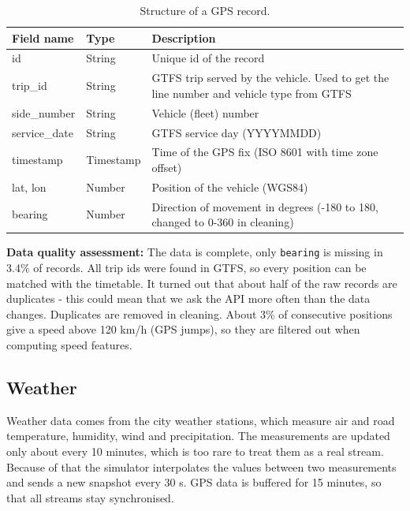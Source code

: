 \documentclass[11pt]{article}
\begin{document}
\begin{table}[H]
\centering
\caption{Structure of a GPS record.}\label{tab:fields-gps}
\begin{tabular}{|>{\raggedright\arraybackslash}p{3.6cm}|>{\raggedright\arraybackslash}p{2cm}|>{\raggedright\arraybackslash}p{8cm}|}
\hline
\textbf{Field name} & \textbf{Type} & \textbf{Description} \\
\hline
id & String & Unique id of the record \\ \hline
trip\_id & String & GTFS trip served by the vehicle. Used to get the line number and vehicle type from GTFS \\ \hline
side\_number & String & Vehicle (fleet) number \\ \hline
service\_date & String & GTFS service day (YYYYMMDD) \\ \hline
timestamp & Timestamp & Time of the GPS fix (ISO 8601 with time zone offset) \\ \hline
lat, lon & Number & Position of the vehicle (WGS84) \\ \hline
bearing & Number & Direction of movement in degrees (-180 to 180, changed to 0-360 in cleaning) \\ \hline
\end{tabular}
\end{table}

\noindent\textbf{Data quality assessment:}
The data is complete, only \texttt{bearing} is missing in 3.4\% of records. All trip ids were found in GTFS, so every position can be matched with the timetable.
It turned out that about half of the raw records are duplicates - this could mean that we ask the API more often than the data changes. 
Duplicates are removed in cleaning. About 3\% of consecutive positions give a speed above 120 km/h (GPS jumps), so they are filtered out when computing speed features.

\subsection{Weather}

Weather data comes from the city weather stations, which measure air and road temperature, humidity, wind and precipitation.
The measurements are updated only about every 10 minutes, which is too rare to treat them as a real stream.
Because of that the simulator interpolates the values between two measurements and sends a new snapshot every 30 s.
GPS data is buffered for 15 minutes, so that all streams stay synchronised.
\end{document}
